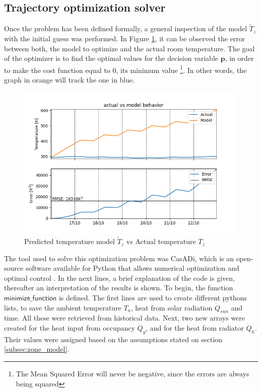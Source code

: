 \subsection{Trajectory optimization solver}
Once the problem has been defined formally, a general inspection of the model $\tilde{T}_{z}$ with the initial guess was performed. In Figure \ref{fig:Model Error}, it can be observed the error between both, the model to optimize and the actual room temperature. The goal of the optimizer is to find the optimal values for the decision variable $\mathbf{p}$, in order to make the cost function equal to 0, its minimum value \footnote{The Mean Squared Error will never be negative, since the errors are always being squared}. In other words, the graph in orange will track the one in blue. 
\begin{figure}[H]
\centering
\includegraphics[scale=0.75]{images/error_actualvsmodel.png}
\caption{Predicted temperature model $\tilde{T}_{z}$ vs Actual temperature $T_z$ }
\label{fig:Model Error}
\end{figure}
The tool used to solve this optimization problem was CasADi, which is an open-source software available for Python that allows numerical optimization and optimal control \cite{Andersson2018}. In the next lines, a brief explanation of the code is given, thereafter an interpretation of the results is shown. To begin, the function $\mathsf{minimize\_function}$ is defined. The first lines are used to create different pythons lists, to save the ambient temperature $T_a$, heat from solar radiation $\dot{Q}_{sun}$ and time. All these were retrieved from historical data. Next, two new arrays were created for the heat input from occupancy $\dot{Q}_{g}$, and for the heat from radiator $\dot{Q}_{h}$. Their values were assigned based on the assumptions stated on section \ref{subsec:zone_model}.

